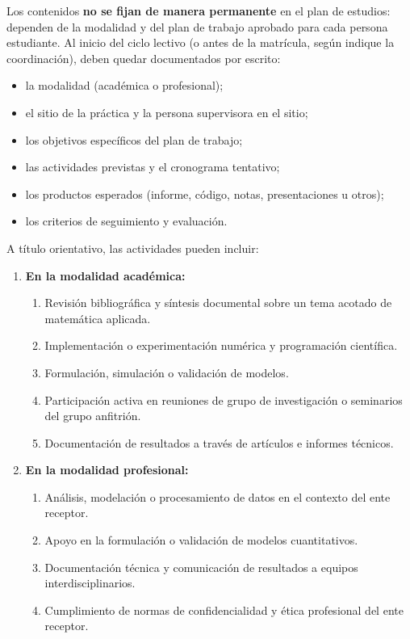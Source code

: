 \begin{refsection}
Los contenidos \textbf{no se fijan de manera permanente} en el plan de estudios: dependen de la modalidad y del plan de trabajo aprobado para cada persona estudiante. Al inicio del ciclo lectivo (o antes de la matrícula, según indique la coordinación), deben quedar documentados por escrito:

\begin{itemize}
\item la modalidad (académica o profesional);
\item el sitio de la práctica y la persona supervisora en el sitio;
\item los objetivos específicos del plan de trabajo;
\item las actividades previstas y el cronograma tentativo;
\item los productos esperados (informe, código, notas, presentaciones u otros);
\item los criterios de seguimiento y evaluación.
\end{itemize}

A título orientativo, las actividades pueden incluir:

\begin{enumerate}
\item \textbf{En la modalidad académica:}
\begin{enumerate}
    \item Revisión bibliográfica y síntesis documental sobre un tema acotado de matemática aplicada.
    \item Implementación o experimentación numérica y programación científica.
    \item Formulación, simulación o validación de modelos.
    \item Participación activa en reuniones de grupo de investigación o seminarios del grupo anfitrión.
    \item Documentación de resultados a través de artículos e informes técnicos.
\end{enumerate}

\item \textbf{En la modalidad profesional:}
\begin{enumerate}
    \item Análisis, modelación o procesamiento de datos en el contexto del ente receptor.
    \item Apoyo en la formulación o validación de modelos cuantitativos.
    \item Documentación técnica y comunicación de resultados a equipos interdisciplinarios.
    \item Cumplimiento de normas de confidencialidad y ética profesional del ente receptor.
\end{enumerate}
\end{enumerate}


\end{refsection}
